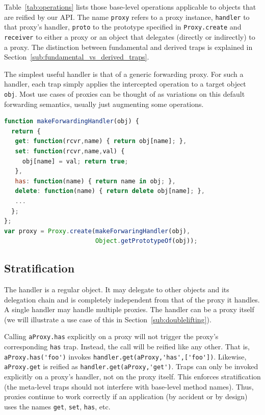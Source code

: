 \documentclass{acm_proc_article-sp}
\begin{document}
Table~\ref{tab:operations} lists those base-level operations applicable to objects that are reified by our API. The name \texttt{proxy} refers to a proxy instance, \texttt{handler} to that proxy's handler, \texttt{proto} to the prototype specified in \texttt{Proxy.create} and \texttt{receiver} to either a proxy or an object that delegates (directly or indirectly) to a proxy. The distinction between fundamental and derived traps is explained in Section~\ref{sub:fundamental_vs_derived_traps}.

The simplest useful handler is that of a generic forwarding proxy. For such a handler, each trap simply applies the intercepted operation to a target object \texttt{obj}. Most use cases of proxies can be thought of as variations on this default forwarding semantics, usually just augmenting some operations.

\begin{lstlisting}[language=javascript]
function makeForwardingHandler(obj) {
  return {
   get: function(rcvr,name) { return obj[name]; },
   set: function(rcvr,name,val) {
     obj[name] = val; return true;
   },
   has: function(name) { return name in obj; },
   delete: function(name) { return delete obj[name]; },
   ...
  };
};
var proxy = Proxy.create(makeForwaringHandler(obj),
                         Object.getPrototypeOf(obj));
\end{lstlisting}

\subsection{Stratification}

The handler is a regular object. It may delegate to other objects and its delegation chain and is completely independent from that of the proxy it handles. A single handler may handle multiple proxies. The handler can be a proxy itself (we will illustrate a use case of this in Section~\ref{sub:doublelifting}).

Calling \lstinline{aProxy.has} explicitly on a proxy will not trigger the proxy's corresponding \texttt{has} trap. Instead, the call will be reified like any other. That is, \lstinline{aProxy.has('foo')} invokes \lstinline{handler.get(aProxy,'has',['foo'])}. Likewise, \lstinline{aProxy.get} is reified as \lstinline{handler.get(aProxy,'get')}. Traps can only be invoked explicitly on a proxy's handler, not on the proxy itself. This enforces stratification (the meta-level traps should not interfere with base-level method names). Thus, proxies continue to work correctly if an application (by accident or by design) uses the names \texttt{get}, \texttt{set}, \texttt{has}, etc.
\end{document}
